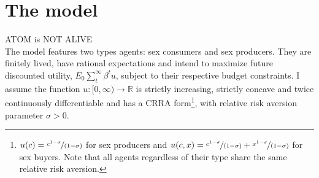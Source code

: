\section{\sf The model}\label{sec4}
ATOM is NOT ALIVE\\
The model features two types agents: sex consumers and sex producers. They are finitely lived, have rational expectations and intend to maximize future discounted utility, $E_{0}\sum_{t}^{\infty}\beta^{t}u$, subject to their respective budget constraints. I assume the function $u:[0,\infty)\to \mathbb{R}$ is strictly increasing, strictly concave and twice continuously differentiable and has a CRRA form\footnote{$u(c)=\nicefrac{c^{1-\sigma}}{(1-\sigma)}$ for sex producers and $u(c,x)=\nicefrac{c^{1-\sigma}}{(1-\sigma)}+\nicefrac{x^{1-\sigma}}{(1-\sigma)}$ for sex buyers.  Note that all agents regardless of their type share the same relative risk aversion. }, with relative risk aversion parameter $\sigma>0$.

